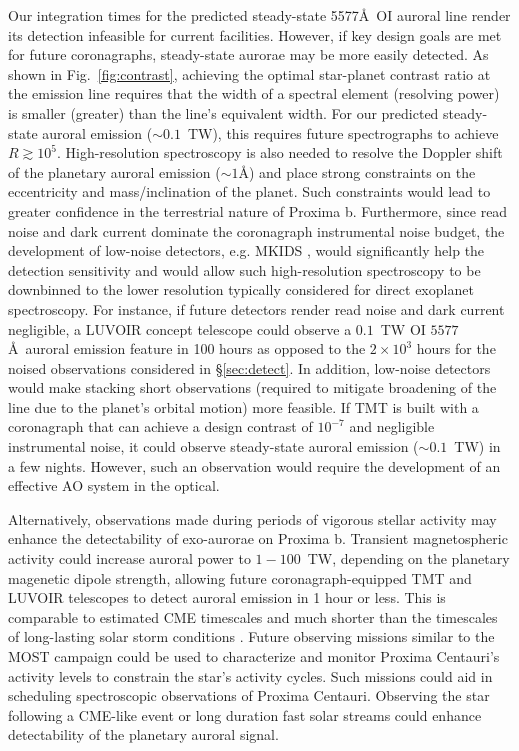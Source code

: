 \documentclass{emulateapj}
\begin{document}
Our integration times for the predicted steady-state 5577\AA\ OI auroral line render its detection infeasible for current facilities. However, if key design goals are met for future coronagraphs, steady-state aurorae may be more easily detected. As shown in Fig.~\ref{fig:contrast}, achieving the optimal star-planet contrast ratio at the emission line requires that the width of a spectral element (resolving power) is smaller (greater) than the line's equivalent width. For our predicted steady-state auroral emission (${\sim}0.1$~TW), this requires future spectrographs to achieve $R \gtrsim 10^5$. High-resolution spectroscopy is also needed to resolve the Doppler shift of the planetary auroral emission (${\sim}1$\AA) and place strong constraints on the eccentricity and mass/inclination of the planet. Such constraints would lead to greater confidence in the terrestrial nature of Proxima b. Furthermore, since read noise and dark current dominate the coronagraph instrumental noise budget, the development of low-noise detectors, e.g. MKIDS \citep{Mazin2012,Mazin2015}, would significantly help the detection sensitivity and would allow such high-resolution spectroscopy to be downbinned to the lower resolution typically considered for direct exoplanet spectroscopy. For instance, if future detectors render read noise and dark current negligible, a LUVOIR concept telescope could observe a $0.1$~TW OI $5577$\AA\ auroral emission feature in 100 hours as opposed to the $2 \times 10^3$ hours for the noised observations considered in \S\ref{sec:detect}. In addition, low-noise detectors would make stacking short observations (required to mitigate broadening of the line due to the planet's orbital motion) more feasible. If TMT is built with a coronagraph that can achieve a design contrast of $10^{-7}$ and negligible instrumental noise, it could observe steady-state auroral emission (${\sim}0.1$~TW) in a few nights. However, such an observation would require the development of an effective AO system in the optical.

Alternatively, observations made during periods of vigorous stellar activity may enhance the detectability of exo-aurorae on Proxima b.  Transient magnetospheric activity could increase auroral power to $1-100$~TW, depending on the planetary magenetic dipole strength, allowing future coronagraph-equipped TMT and LUVOIR telescopes to detect auroral emission in 1 hour or less. This is comparable to estimated CME timescales \citep{Khodachenko2007} and much shorter than the timescales of long-lasting solar storm conditions \citep{Gonzalez1994,Gonzalez1999}. Future observing missions similar to the MOST campaign \citep[e.g.][]{Davenport2016} could be used to characterize and monitor Proxima Centauri's activity levels to constrain the star's activity cycles. Such missions could aid in scheduling spectroscopic observations of Proxima Centauri. Observing the star following a CME-like event or long duration fast solar streams could enhance detectability of the planetary auroral signal.  
\end{document}
